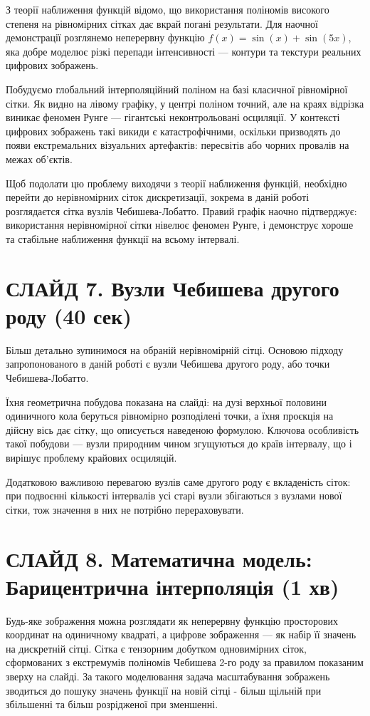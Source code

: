 \documentclass[12pt,a4paper]{article}
\begin{document}
З теорії наближення функцій відомо, що використання поліномів високого степеня на рівномірних сітках дає вкрай погані результати. Для наочної демонстрації розглянемо неперервну функцію $f(x) = \sin(x) + \sin(5x)$, яка добре моделює різкі перепади інтенсивності — контури та текстури реальних цифрових зображень.

Побудуємо глобальний інтерполяційний поліном на базі класичної рівномірної сітки. Як видно на лівому графіку, у центрі поліном точний, але на краях відрізка виникає феномен Рунге — гігантські неконтрольовані осциляції. У контексті цифрових зображень такі викиди є катастрофічними, оскільки призводять до появи екстремальних візуальних артефактів: пересвітів або чорних провалів на межах об'єктів.

Щоб подолати цю проблему виходячи з теорії наближення функцій, необхідно перейти до нерівномірних сіток дискретизації, зокрема в даній роботі розглядаєтся сітка вузлів Чебишева-Лобатто. Правий графік наочно підтверджує: використання нерівномірної сітки нівелює феномен Рунге, і демонструє хороше та стабільне наближення функції на всьому інтервалі.

\section*{СЛАЙД 7. Вузли Чебишева другого роду (40 сек)}

Більш детально зупинимося на обраній нерівномірній сітці. Основою підходу запропонованого в даній роботі є вузли Чебишева другого роду, або точки Чебишева-Лобатто. 

Їхня геометрична побудова показана на слайді: на дузі верхньої половини одиничного кола беруться рівномірно розподілені точки, а їхня проєкція на дійсну вісь дає сітку, що описується наведеною формулою. Ключова особливість такої побудови — вузли природним чином згущуються до країв інтервалу, що і вирішує проблему крайових осциляцій. 

Додатковою важливою перевагою вузлів саме другого роду є вкладеність сіток: при подвоєнні кількості інтервалів усі старі вузли збігаються з вузлами нової сітки, тож значення в них не потрібно перераховувати.
	
	\section*{СЛАЙД 8. Математична модель: Барицентрична інтерполяція (1 хв)}
	
	Будь-яке зображення можна розглядати як неперервну функцію просторових координат на одиничному квадраті, а цифрове зображення — як набір її значень на дискретній сітці. Сітка є тензорним добутком одновимірних сіток, сформованих з екстремумів поліномів Чебишева 2-го роду за правилом показаним зверху на слайді. За такого моделювання задача масштабування зображень зводиться до пошуку значень функції на новій сітці - більш щільній при збільшенні та більш розрідженої при зменшенні.
	
\end{document}
